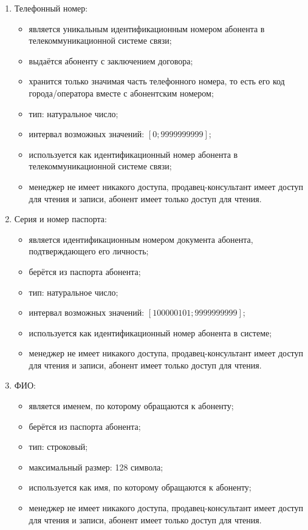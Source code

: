 \begin{enumerate}
\begin{enumerate}
        \item Телефонный номер:
        \begin{itemize}
            \item является уникальным идентификационным номером абонента в телекоммуникационной системе связи;
            \item выдаётся абоненту с заключением договора;
            \item хранится только значимая часть телефонного номера, то есть его код города/оператора вместе с абонентским номером; 
            \item тип: натуральное число;
            \item интервал возможных значений: $[0; 9 999 999 999]$;
            \item используется как идентификационный номер абонента в телекоммуникационной системе связи;
            \item менеджер не имеет никакого доступа, продавец-консультант имеет доступ для чтения и записи, абонент имеет только доступ для чтения.
        \end{itemize}

        \item Серия и номер паспорта:
        \begin{itemize}
            \item является идентификационным номером документа абонента, подтверждающего его личность;
            \item берётся из паспорта абонента;
            \item тип: натуральное число;
            \item интервал возможных значений: $[100000101; 9 999 999 999]$;
            \item используется как идентификационный номер абонента в системе;
            \item менеджер не имеет никакого доступа, продавец-консультант имеет доступ для чтения и записи, абонент имеет только доступ для чтения.
        \end{itemize}

        \item ФИО:
        \begin{itemize}
            \item является именем, по которому обращаются к абоненту;
            \item берётся из паспорта абонента;
            \item тип: строковый;
            \item максимальный размер: 128 символа; %
            \item используется как имя, по которому обращаются к абоненту;
            \item менеджер не имеет никакого доступа, продавец-консультант имеет доступ для чтения и записи, абонент имеет только доступ для чтения.
        \end{itemize}


\end{enumerate}
\end{enumerate}
